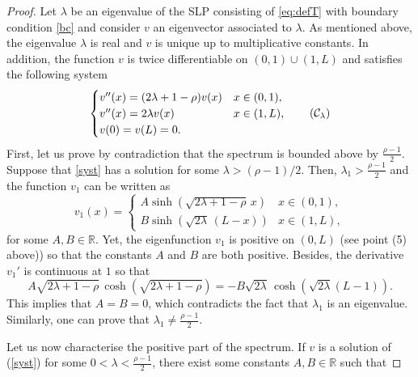 \documentclass[11pt]{article}
\theoremstyle{plain}
\begin{document}
\begin{proof}
Let $\lambda$ be an eigenvalue of the SLP consisting of \eqref{eq:defT} with boundary condition \eqref{bc} and consider $v$ an eigenvector associated to $\lambda$. As mentioned above, the eigenvalue $\lambda$ is real and $v$ is unique up to multiplicative constants. In addition, the function $v$ is twice differentiable on $(0,1)\cup(1,L)$ and satisfies the following system
\begin{equation}
    \begin{cases}
    v''(x)=(2\lambda+1-\rho) v(x) &  x \in (0,1) ,\\
    v''(x)=2\lambda v(x) & x\in(1,L),\\
    v(0)=v(L)=0.
    \end{cases}
    \label{syst}
    \tag{$\mathcal{C}_\lambda$}
\end{equation}
First, let us prove by contradiction that the spectrum is bounded above by $\frac{\rho-1}{2}$. Suppose that \eqref{syst} has a solution for some   $\lambda>(\rho-1)/2.$ Then, $\lambda_1>\frac{\rho-1}{2}$ and the function $v_1$ can be written as \begin{equation}
    v_1(x)=\begin{cases}
         A\sinh\left(\sqrt{2\lambda+1-\rho}\,x\right) &  x\in (0,1), \\
         B\sinh\left(\sqrt{2\lambda}\,(L-x)\right) & x\in(1,L),
    \end{cases}
    \label{evlpo}
\end{equation}{}for some $A,B\in \mathbb{R}$. Yet, the eigenfunction $v_1$ is positive on $(0,L)$ (see point (5) above)) so that the constants $A$ and $B$ are both positive. Besides, the derivative  $v_1'$ is continuous at $1$ so that 
\begin{equation*}
A\sqrt{2\lambda+1-\rho}\,\cosh(\sqrt{2\lambda+1-\rho})=-B\sqrt{2\lambda}\,\cosh(\sqrt{2\lambda}(L-1)).
\end{equation*}
This implies that $A=B=0$, which contradicts the fact that $\lambda_1$ is an eigenvalue. Similarly, one can prove that $\lambda_1\neq\frac{\rho-1}{2}$. 


Let us now characterise the positive part of the spectrum. If $v$ is a solution of  (\ref{syst}) for some $0<\lambda<\frac{\rho-1}{2}$, there exist some constants $A,B\in \mathbb{R}$ such that


\end{proof}
\end{document}
